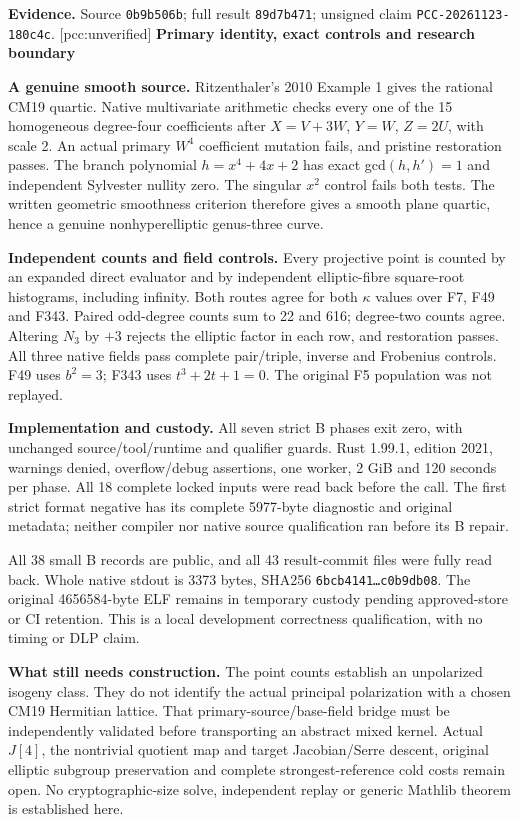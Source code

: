 \documentclass[10pt,a4paper]{article}
\begin{document}
\textbf{Evidence.} Source \texttt{0b9b506b}; full result \texttt{89d7b471};
unsigned claim \texttt{PCC-20261123-180c4c}. [pcc:unverified]
\newpage
{\Large\bfseries Primary identity, exact controls and research boundary}\par

\textbf{A genuine smooth source.}
Ritzenthaler's 2010 Example 1 gives the rational CM19 quartic. Native
multivariate arithmetic checks every one of the 15 homogeneous degree-four
coefficients after $X=V+3W$, $Y=W$, $Z=2U$, with scale 2. An actual
primary $W^4$ coefficient mutation fails, and pristine restoration passes.
The branch polynomial $h=x^4+4x+2$ has exact gcd$(h,h')=1$ and independent
Sylvester nullity zero. The singular $x^2$ control fails both tests.
The written geometric smoothness criterion therefore gives a smooth plane
quartic, hence a genuine nonhyperelliptic genus-three curve.

\textbf{Independent counts and field controls.}
Every projective point is counted by an expanded direct evaluator and by
independent elliptic-fibre square-root histograms, including infinity.
Both routes agree for both $\kappa$ values over F7, F49 and F343. Paired
odd-degree counts sum to 22 and 616; degree-two counts agree. Altering
$N_3$ by $+3$ rejects the elliptic factor in each row, and restoration passes.
All three native fields pass complete pair/triple, inverse and Frobenius
controls. F49 uses $b^2=3$; F343 uses $t^3+2t+1=0$. The original F5
population was not replayed.

\textbf{Implementation and custody.}
All seven strict B phases exit zero, with unchanged source/tool/runtime and
qualifier guards. Rust 1.99.1, edition 2021, warnings denied, overflow/debug
assertions, one worker, 2 GiB and 120 seconds per phase. All 18 complete
locked inputs were read back before the call. The first strict format
negative has its complete 5977-byte diagnostic and original metadata;
neither compiler nor native source qualification ran before its B repair.

All 38 small B records are public, and all 43 result-commit files were
fully read back. Whole native stdout is 3373 bytes, SHA256
\texttt{6bcb4141\ldots c0b9db08}. The original 4656584-byte ELF remains in
temporary custody pending approved-store or CI retention. This is a local
development correctness qualification, with no timing or DLP claim.

\textbf{What still needs construction.}
The point counts establish an unpolarized isogeny class. They do not
identify the actual principal polarization with a chosen CM19 Hermitian
lattice. That primary-source/base-field bridge must be independently
validated before transporting an abstract mixed kernel. Actual $J[4]$,
the nontrivial quotient map and target Jacobian/Serre descent, original
elliptic subgroup preservation and complete strongest-reference cold costs
remain open. No cryptographic-size solve, independent replay or generic
Mathlib theorem is established here.
\end{document}
